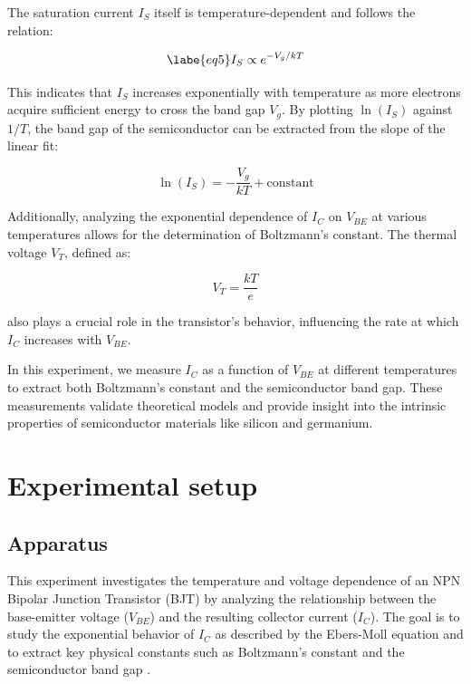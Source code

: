 \documentclass[12pt,letterpaper,twocolumn]{article}
\begin{document}
The saturation current \( I_S \) itself is temperature-dependent and follows the relation:

\begin{equation}\labe{eq5}
I_S \propto e^{-V_g/kT}
\end{equation}

This indicates that \( I_S \) increases exponentially with temperature as more electrons acquire sufficient energy to cross the band gap \( V_g \). By plotting \( \ln(I_S) \) against \( 1/T \), the band gap of the semiconductor can be extracted from the slope of the linear fit:

\begin{equation}\label{eq6}
\ln(I_S) = -\frac{V_g}{kT} + \text{constant}
\end{equation}

Additionally, analyzing the exponential dependence of \( I_C \) on \( V_{BE} \) at various temperatures allows for the determination of Boltzmann’s constant. The thermal voltage \( V_T \), defined as:

\begin{equation}\label{eq7}
V_T = \frac{kT}{e}
\end{equation}


also plays a crucial role in the transistor’s behavior, influencing the rate at which \( I_C \) increases with \( V_{BE} \)\cite{Collings1980}.

In this experiment, we measure \( I_C \) as a function of \( V_{BE} \) at different temperatures to extract both Boltzmann’s constant and the semiconductor band gap. These measurements validate theoretical models and provide insight into the intrinsic properties of semiconductor materials like silicon and germanium.



\section{Experimental setup}


\subsection{Apparatus}

This experiment investigates the temperature and voltage dependence of an NPN Bipolar Junction Transistor (BJT) by analyzing the relationship between the base-emitter voltage (\( V_{BE} \)) and the resulting collector current (\( I_C \)). The goal is to study the exponential behavior of \( I_C \) as described by the Ebers-Moll equation and to extract key physical constants such as Boltzmann’s constant and the semiconductor band gap \cite{Neudeck}.
\end{document}
